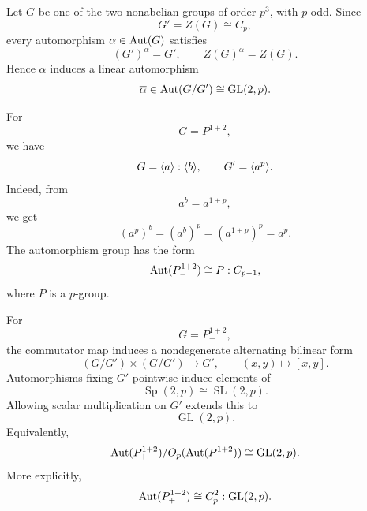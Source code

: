 \begin{remark}
Let \(G\) be one of the two nonabelian groups of order \(p^3\), with \(p\) odd. Since
\[
    G'=Z(G)\cong C_p,
\]
every automorphism \(\alpha\in\operatorname{Aut}(G)\) satisfies
\[
    (G')^\alpha=G',
    \qquad
    Z(G)^\alpha=Z(G).
\]
Hence \(\alpha\) induces a linear automorphism
\[
    \overline{\alpha}\in \operatorname{Aut}(G/G')
    \cong \operatorname{GL}(2,p).
\]

For
\[
    G=P_-^{1+2},
\]
we have
\[
    G=\langle a\rangle:\langle b\rangle,
    \qquad
    G'=\langle a^p\rangle.
\]
Indeed, from
\[
    a^b=a^{1+p},
\]
we get
\[
    (a^p)^b=(a^b)^p=(a^{1+p})^p=a^p.
\]
The automorphism group has the form
\[
    \operatorname{Aut}(P_-^{1+2})\cong P:C_{p-1},
\]
where \(P\) is a \(p\)-group.

For
\[
    G=P_+^{1+2},
\]
the commutator map induces a nondegenerate alternating bilinear form
\[
    (G/G')\times (G/G')\longrightarrow G',
    \qquad
    (\overline{x},\overline{y})\longmapsto [x,y].
\]
Automorphisms fixing \(G'\) pointwise induce elements of
\[
    \operatorname{Sp}(2,p)\cong \operatorname{SL}(2,p).
\]
Allowing scalar multiplication on \(G'\) extends this to
\[
    \operatorname{GL}(2,p).
\]
Equivalently,
\[
    \operatorname{Aut}(P_+^{1+2})/O_p(\operatorname{Aut}(P_+^{1+2}))
    \cong
    \operatorname{GL}(2,p).
\]
More explicitly,
\[
    \operatorname{Aut}(P_+^{1+2})
    \cong
    C_p^2:\operatorname{GL}(2,p).
\]
\end{remark}